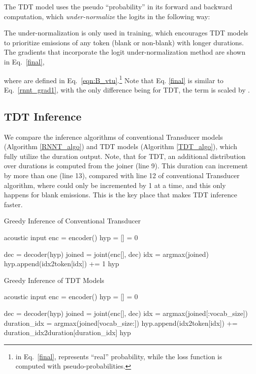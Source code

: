 \documentclass{article}
\begin{document}
The TDT model uses the pseudo ``probability''   in its forward and backward computation, which \emph{under-normalize} the logits in the following way:

The under-normalization is only used in training, which encourages TDT models to prioritize emissions of any token (blank or non-blank) with longer durations. 
The gradients that incorporate the logit under-normalization method are shown in Eq.~\ref{final}, 

where   are defined in Eq.~\ref{eqn:B_vtu}.\footnote{  in  
Eq.~\ref{final}, represents ``real'' probability, while the loss function  is computed with pseudo-probabilities.}
Note that Eq. \ref{final} is similar to 
Eq.~\ref{rnnt_grad1}, with the only difference being for TDT, the  term is scaled by . 


\subsection{TDT Inference}
We compare the inference algorithms of conventional Transducer models (Algorithm \ref{RNNT_algo}) and TDT models (Algorithm \ref{TDT_algo}), which fully utilize the duration output.
Note, that for TDT, an additional distribution over durations is computed from the joiner (line 9).  This duration can increment  by more than one (line 13), compared with line 12 of conventional Transducer algorithm, where  could only be incremented by 1 at a time, and this only happens for blank emissions. This is the key place that makes TDT inference faster.
\begin{algorithm}[tb]
   \caption{Greedy Inference of Conventional Transducer}
   \label{RNNT_algo}
\begin{algorithmic}[1]
    acoustic input 
    \STATE enc = encoder()
    \STATE hyp = []
    \STATE  = 0

    \STATE dec = decoder(hyp)
    \STATE joined = joint(enc[], dec)
\STATE idx = argmax(joined)
    \STATE hyp.append(idx2token[idx])
    \ELSE
    \STATE  += 1 
    \ENDIF
    \ENDWHILE
     hyp 
\end{algorithmic}
\end{algorithm}

\begin{algorithm}[t]
   \caption{Greedy Inference of TDT Models}
   \label{TDT_algo}
\begin{algorithmic}[1]
    acoustic input 
    \STATE enc = encoder()
    \STATE hyp = []
    \STATE  = 0

    \STATE dec = decoder(hyp)
    \STATE joined = joint(enc[], dec)
\STATE idx = argmax(joined[:vocab\_size])
    \STATE duration\_idx = argmax(joined[vocab\_size:])
    \STATE hyp.append(idx2token[idx])
    \ENDIF
    \STATE  += duration\_idx2duration[duration\_idx]
    \ENDWHILE
     hyp 
\end{algorithmic}
\end{algorithm}
\end{document}
